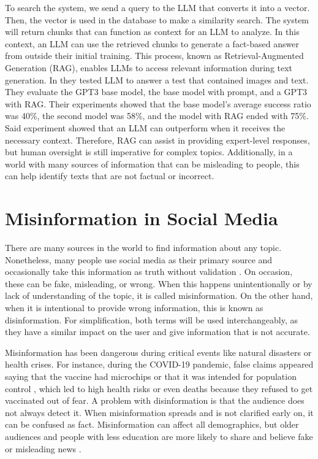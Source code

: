 To search the system, we send a query to the LLM that converts it into a vector. Then, the vector is used in the database to make a similarity search. The system will return chunks that can function as context for an LLM to
analyze. In this context, an LLM can use the retrieved chunks to generate a fact-based answer from outside their initial training. This process, known as Retrieval-Augmented Generation (RAG), enables LLMs to access relevant
information during text generation. In \cite{10683437} they tested LLM to answer a test that contained images and text. They evaluate the GPT3 base model, the base model with prompt, and a GPT3 with RAG. Their experiments
showed that the base model's average success ratio was 40\%, the second model was 58\%, and the model with RAG ended with 75\%. Said experiment showed that an LLM can outperform when it receives the necessary context.
Therefore, RAG can assist in providing expert-level responses, but human oversight is still imperative for complex topics. Additionally, in a world with many sources of information that can be misleading to people, this can help identify
texts that are not factual or incorrect. 


\section{Misinformation in Social Media}
There are many sources in the world to find information about any topic. Nonetheless, many people use social media as their primary source \cite{socialmedias} and occasionally take this information as truth without
validation \cite{social_fact}. On occasion, these can be fake, misleading, or wrong. When this happens unintentionally or by lack of understanding of the topic, it is called misinformation. On the other hand,
when it is intentional to provide wrong information, this is known as disinformation. For simplification, both terms will be used interchangeably, as they have a similar impact on the user and give information that is not accurate.

Misinformation has been dangerous during critical events like natural disasters or health crises. For instance, during the COVID-19 pandemic, false claims appeared saying that the vaccine had
microchips or that it was intended for population control \cite{article_vaccine}, which led to high health risks or even deaths \cite{article} because they refused to get vaccinated out of fear. A problem with disinformation is that the audience
does not always detect it. When misinformation spreads and is not clarified early on, it can be confused as fact. Misinformation can affect all demographics, but older audiences and people with less education are more
likely to share and believe fake or misleading news  \cite{encyclopedia3040099}. 

